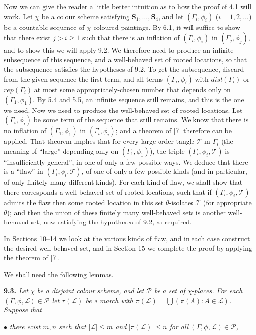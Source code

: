 Now we can give the reader a little better intuition as to how the proof of 4.1 will work. Let $\chi$ be a colour scheme satisfying $\mathbf{S}_1, \ldots, \mathbf{S}_4$, and let $(\Gamma_i, \phi_i)$ ($i = 1, 2, \ldots$) be a countable sequence of $\chi$-coloured paintings. By 6.1, it will suffice to show that there exist $j > i \ge 1$ such that there is an inflation of $(\Gamma_i, \phi_i)$ in $(\Gamma_j, \phi_j)$, and to show this we will apply 9.2. We therefore need to produce an infinite subsequence of this sequence, and a well-behaved set of rooted locations, so that the subsequence satisfies the hypotheses of 9.2. To get the subsequence, discard from the given sequence the first term, and all terms $(\Gamma_i, \phi_i)$ with $dist(\Gamma_i)$ or $rep(\Gamma_i)$ at most some appropriately-chosen number that depends only on $(\Gamma_1, \phi_1)$. By 5.4 and 5.5, an infinite sequence still remains, and this is the one we need. Now we need to produce the well-behaved set of rooted locations. Let $(\Gamma_i, \phi_i)$ be some term of the sequence that still remains. We know that there is no inflation of $(\Gamma_1, \phi_1)$ in $(\Gamma_i, \phi_i)$; and a theorem of [7] therefore can be applied. That theorem implies that for every large-order tangle $\mathscr{T}$ in $\Gamma_i$ (the meaning of ``large'' depending only on $(\Gamma_1, \phi_1)$), the triple $(\Gamma_i, \phi_i, \mathscr{T})$ is ``insufficiently general'', in one of only a few possible ways. We deduce that there is a ``flaw'' in $(\Gamma_i, \phi_i, \mathscr{T})$, of one of only a few possible kinds (and in particular, of only finitely many different kinds). For each kind of flaw, we shall show that there corresponds a well-behaved set of rooted locations, such that if $(\Gamma_i, \phi_i, \mathscr{T})$ admits the flaw then some rooted location in this set $\theta$-isolates $\mathscr{T}$ (for appropriate $\theta$); and then the union of these finitely many well-behaved sets is another well-behaved set, now satisfying the hypotheses of 9.2, as required.

In Sections 10--14 we look at the various kinds of flaw, and in each case construct the desired well-behaved set, and in Section 15 we complete the proof by applying the theorem of [7].

We shall need the following lemmas.

\textbf{9.3.} \textit{Let $\chi$ be a disjoint colour scheme, and let $\mathscr{P}$ be a set of $\chi$-places. For each $(\Gamma, \phi, \mathscr{L}) \in \mathscr{P}$ let $\pi(\mathscr{L})$ be a march with $\bar{\pi}(\mathscr{L}) = \bigcup (\bar{\pi}(A) : A \in \mathscr{L})$. Suppose that}

\hspace*{12pt}$\bullet$ \textit{there exist $m, n$ such that $|\mathscr{L}| \le m$ and $|\bar{\pi}(\mathscr{L})| \le n$ for all $(\Gamma, \phi, \mathscr{L}) \in \mathscr{P}$,}
